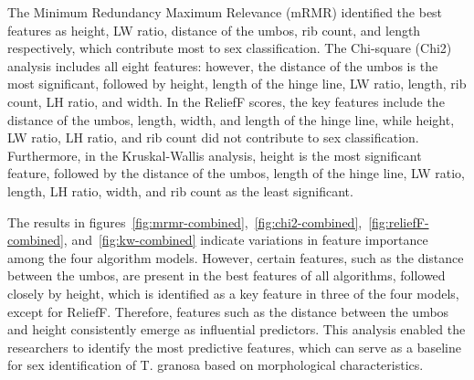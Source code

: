 The Minimum Redundancy Maximum Relevance (mRMR) identified the best features as height, LW ratio, distance of the umbos, rib count, and length respectively, which contribute most to sex classification. The Chi-square (Chi2) analysis includes all eight features: however, the distance of the umbos is the most significant, followed by height, length of the hinge line, LW ratio, length, rib count, LH ratio, and width. In the ReliefF scores, the key features include the distance of the umbos, length, width, and length of the hinge line, while height, LW ratio, LH ratio, and rib count did not contribute to sex classification. Furthermore, in the Kruskal-Wallis analysis, height is the most significant feature, followed by the distance of the umbos, length of the hinge line, LW ratio, length, LH ratio, width, and rib count as the least significant.

The results in figures~\ref{fig:mrmr-combined},~\ref{fig:chi2-combined},~\ref{fig:reliefF-combined}, and~\ref{fig:kw-combined} indicate variations in feature importance among the four algorithm models. However, certain features, such as the distance between the umbos, are present in the best features of all algorithms, followed closely by height, which is identified as a key feature in three of the four models, except for ReliefF. Therefore, features such as the distance between the umbos and height consistently emerge as influential predictors. This analysis enabled the researchers to identify the most predictive features, which can serve as a baseline for sex identification of T. granosa based on morphological characteristics. 




